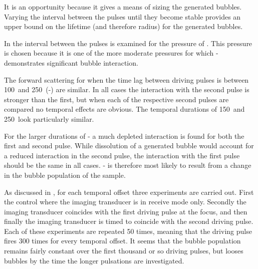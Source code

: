 It is an opportunity because it gives a  means of sizing the generated bubbles.
Varying the interval between the pulses until they become stable
provides an upper bound on the lifetime (and therefore radius)
for the generated bubbles.

In  the interval between the pulses is examined 
for the pressure of .
This pressure is chosen because it is one of the more moderate pressures 
for which - 
demonstrates significant bubble interaction.

The forward scattering for when the time lag between driving pulses 
is between \unit{100}\micro\second\ and \unit{250}\micro\second\ (-) are similar.
In all cases the interaction with the second pulse is stronger than the first,
but when each of the respective second pulses are compared no temporal effects are obvious.
The temporal durations of \unit{150}\micro\second\ and \unit{250}\micro\second\ look particularly similar.


For the larger durations of -
a much depleted interaction is found for both the first and second pulse.
While dissolution of a generated bubble would account for a reduced interaction in the second pulse,
the interaction with the first pulse should be the same in  all cases.
-
is therefore most likely to result from a change in the bubble population of the sample.

As discussed in , for each temporal offset three experiments are carried out.
First the control where the imaging transducer is in receive mode only.
Secondly the imaging transducer coincides with the first driving pulse at the focus,
and then finally the imaging transducer is timed to coincide with the second driving pulse.
Each of these experiments are repeated 50 times, meaning that the driving pulse
fires 300 times for every temporal offset.
It seems that the bubble population remains fairly constant over the first thousand or so driving pulses,
but looses bubbles by the time the longer pulsations are investigated.






